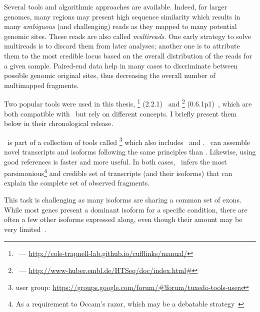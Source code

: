 Several tools and algorithmic approaches are available.
Indeed, for larger genomes, many regions may present high sequence similarity
which results in many \emph{ambiguous} (and challenging) reads as they mapped to
many potential genomic sites. These reads are also called \emph{multireads}.
One early strategy to solve multireads is to discard them from later analyses;
another one is to attribute them to the most credible locus based on
the overall distribution of the reads for a given sample. 
Paired-end data help in many cases to discriminate between possible genomic
original sites, thus decreasing the overall number of multimapped fragments.\mybr\

Two popular tools were used in this thesis,
\cuffl\footnote{\cuffl\ ---
\href{http://cole-trapnell-lab.github.io/ufflinks/manual/}%
{http://cole-trapnell-lab.github.io/cufflinks/manual/}} (2.2.1)~ and
\htseq\footnote{\htseq\ ---
\href{http://www-huber.embl.de/HTSeq/doc/index.html\#}%
{http://www-huber.embl.de/HTSeq/doc/index.html\#}} (0.6.1p1)~,
which are both compatible with \toph\ but rely on different concepts.
I briefly present them below in their chronological release.\mybr\

\label{minisec:Cufflinks}
\cuffl\ is part of a collection of tools called
\footnote{ user group:
\href{https://groups.google.com/forum/\#!forum/tuxedo-tools-users}%
{https://groups.google.com/forum/\#!forum/tuxedo-tools-users}} which also includes
\toph\ and .
\cuffl\ can assemble
 novel transcripts and isoforms following the same principles
than \toph. Likewise, using good references is faster and more useful.
In both cases, \cuffl\ infers the most parsimonious\footnote{As a requirement to
Occam's razor, which may be a debatable strategy~}
and credible set of transcripts (and their isoforms) that can explain the
complete set of observed fragments.\mybr\

This task is challenging as many isoforms are sharing a common set of exons.
While most genes present a dominant isoform for a specific condition,
there are often a few other isoforms expressed along, even though their amount
may be very limited~.\mybr\

